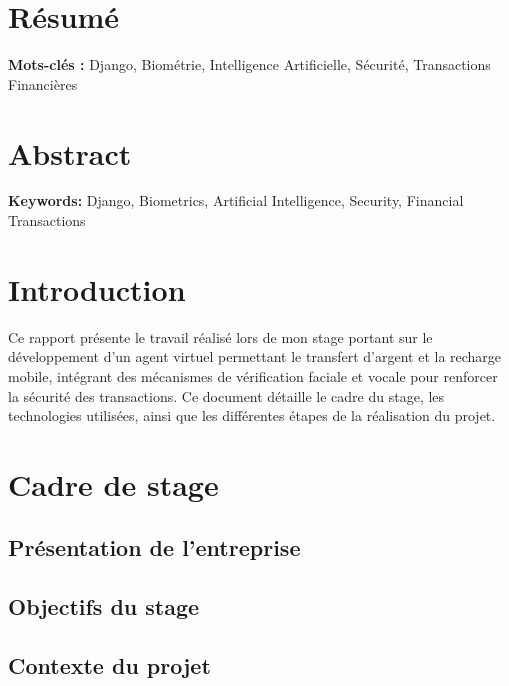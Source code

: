 \documentclass[12pt,a4paper]{report}
\begin{document}
\chapter*{Résumé}
\lipsum[3-4]

\textbf{Mots-clés :} Django, Biométrie, Intelligence Artificielle, Sécurité, Transactions Financières

\chapter*{Abstract}
\lipsum[5-6]

\textbf{Keywords:} Django, Biometrics, Artificial Intelligence, Security, Financial Transactions

\listoffigures
\listoftables
\newpage

\chapter*{Introduction}
Ce rapport présente le travail réalisé lors de mon stage portant sur le développement d'un agent virtuel permettant le transfert d'argent et la recharge mobile, intégrant des mécanismes de vérification faciale et vocale pour renforcer la sécurité des transactions. Ce document détaille le cadre du stage, les technologies utilisées, ainsi que les différentes étapes de la réalisation du projet.

\chapter{Cadre de stage}
\section{Présentation de l'entreprise}

\section{Objectifs du stage}

\section{Contexte du projet}
\end{document}
